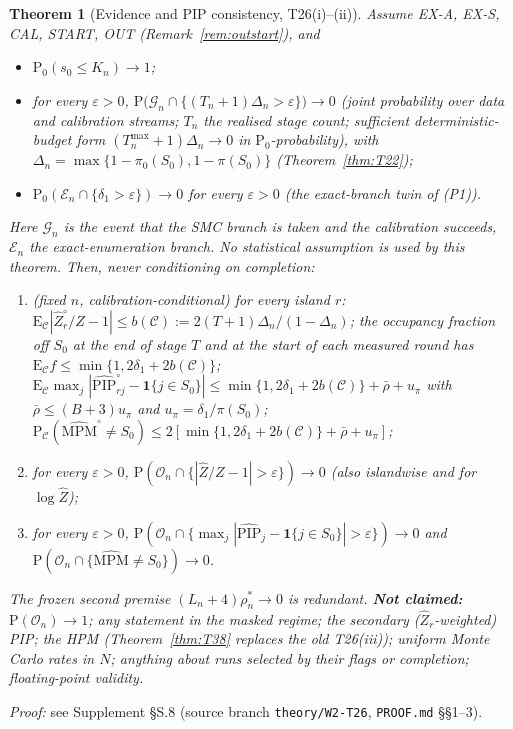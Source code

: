 \documentclass[11pt]{article}
\newtheorem{theorem}{Theorem}
\theoremstyle{definition}
\theoremstyle{remark}
\renewcommand{\Pr}{\mathrm{P}}
\newcommand{\E}{\mathrm{E}}
\newcommand{\Sz}{S_0}
\newcommand{\Zh}{\widehat Z}
\newcommand{\PIPh}{\widehat{\mathrm{PIP}}}
\newcommand{\MPM}{\mathrm{MPM}}
\newcommand{\cC}{\mathcal C}
\newcommand{\cO}{\mathcal O}
\newcommand{\cE}{\mathcal E}
\newcommand{\cG}{\mathcal G}
\newcommand{\Ind}{\mathbf 1}
\begin{document}
\begin{theorem}[Evidence and PIP consistency, T26(i)--(ii)]\label{thm:T26}
Assume EX-A, EX-S, CAL, START, OUT (Remark~\ref{rem:outstart}), and
\begin{itemize}
\item[$(\Omega)$] $\Pr_0(s_0\le K_n)\to1$;
\item[(P1)] for every $\varepsilon>0$, $\Pr\big(\cG_n\cap\{(T_n+1)\Delta_n>\varepsilon\}\big)\to0$ (joint probability over data and calibration streams; $T_n$ the \emph{realised} stage count; sufficient deterministic-budget form $(T^{\max}_n+1)\Delta_n\to0$ in $\Pr_0$-probability), with $\Delta_n=\max\{1-\pi_0(\Sz),1-\pi(\Sz)\}$ (Theorem~\ref{thm:T22});
\item[(P1-ex)] $\Pr_0(\cE_n\cap\{\delta_1>\varepsilon\})\to0$ for every $\varepsilon>0$ (the exact-branch twin of (P1)).
\end{itemize}
Here $\cG_n$ is the event that the SMC branch is taken and the calibration succeeds, $\cE_n$ the exact-enumeration branch. No statistical assumption is used by this theorem. Then, \emph{never conditioning on completion}:
\begin{enumerate}
\item[(A-0)] (fixed $n$, calibration-conditional) for every island $r$: $\E_{\cC}|\Zh^\circ_r/Z-1|\le b(\cC):=2(T+1)\Delta_n/(1-\Delta_n)$; the occupancy fraction off $\Sz$ at the end of stage $T$ and at the start of each measured round has $\E_{\cC}f\le\min\{1,2\delta_1+2b(\cC)\}$; $\E_{\cC}\max_j|\PIPh^\circ_{rj}-\Ind\{j\in\Sz\}|\le\min\{1,2\delta_1+2b(\cC)\}+\bar\rho+u_\pi$ with $\bar\rho\le(B+3)u_\pi$ and $u_\pi=\delta_1/\pi(\Sz)$; $\Pr_{\cC}(\widehat{\MPM}^\circ\ne\Sz)\le2[\min\{1,2\delta_1+2b(\cC)\}+\bar\rho+u_\pi]$;
\item[(A-i)] for every $\varepsilon>0$, $\Pr(\cO_n\cap\{|\Zh/Z-1|>\varepsilon\})\to0$ (also islandwise and for $\log\Zh$);
\item[(A-ii)] for every $\varepsilon>0$, $\Pr(\cO_n\cap\{\max_j|\PIPh_j-\Ind\{j\in\Sz\}|>\varepsilon\})\to0$ and $\Pr(\cO_n\cap\{\widehat{\MPM}\ne\Sz\})\to0$.
\end{enumerate}
The frozen second premise $(L_n+4)\rho^*_n\to0$ is redundant. \textbf{Not claimed:} $\Pr(\cO_n)\to1$; any statement in the masked regime; the secondary ($\Zh_r$-weighted) PIP; the HPM (Theorem~\ref{thm:T38} replaces the old T26(iii)); uniform Monte Carlo rates in $N$; anything about runs selected by their flags or completion; floating-point validity.
\end{theorem}
\noindent\emph{Proof:} see Supplement \S S.8 (source branch \texttt{theory/W2-T26}, \texttt{PROOF.md} \S\S1--3).
\end{document}
